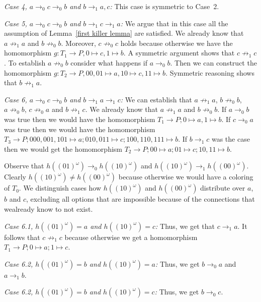 \documentclass[a4paper]{article}
\newcommand{\case}[2]{\vspace{1ex}\noindent\textit{Case #1, #2:}}
\begin{document}
\case{4}{$a \rightarrow_0 c \rightarrow_0 b$ and $b \rightarrow_1 a,c$}
This case is symmetric to Case~2.

\case{5}{$a \rightarrow_0 c \rightarrow_0 b$ and $b \rightarrow_1 c
\rightarrow_1 a$}
We argue that in this case all the assumption of Lemma~\ref{first killer
lemma} are satisfied. We already know that $a \not \rightarrow_1 a$ and
$b \not \rightarrow_0 b$. Moreover, $c \not \rightarrow_0 c$ holds
because otherwise we have the homomorphism $g : T_1 \to P, 0 \mapsto c,
1 \mapsto b$. A symmetric argument shows that $c \not \rightarrow_1 c$.
To establish $a \not \rightarrow_0 b$ consider what happens if $a
\rightarrow_0 b$. Then we can construct the homomorphism $g : T_2 \to P,
00, 01 \mapsto a, 10 \mapsto c, 11 \mapsto b$. Symmetric reasoning shows
that $b \not \rightarrow_1 a$.

\case{6}{$a \rightarrow_0 c \rightarrow_0 b$ and $b \rightarrow_1 a
\rightarrow_1 c$}
We can establish that $a \not \rightarrow_1 a$, $b \not \rightarrow_0
b$, $a \not \rightarrow_0 b$, $c \not \rightarrow_0 a$ and $b \not
\rightarrow_1 c$. We already know that $a \not \rightarrow_1 a$ and $b
\not \rightarrow_0 b$. If $a \rightarrow_0 b$ was true then we would
have the homomorphism $T_1 \to P; 0 \mapsto a, 1 \mapsto b$. If $c
\rightarrow_0 a$ was true then we would have the homomorphism $T_3 \to
P; 000,001,101 \mapsto a; 010,011 \mapsto c; 100,110,111 \mapsto b$. If
$b \rightarrow_1 c$ was the case then we would get the homomorphism $T_2
\to P; 00 \mapsto a; 01 \mapsto c; 10,11 \mapsto b$.

Observe that $h((01)^\omega) \rightarrow_0 h((10)^\omega)$ and 
$h((10)^\omega) \rightarrow_1 h((00)^\omega)$. Clearly
$h((10)^\omega) \neq h((00)^\omega)$ because otherwise we would have a
coloring of $T_0$. We distinguish cases how $h((10)^\omega)$ and
$h((00)^\omega)$ distribute over $a$, $b$ and $c$, excluding all options
that are impossible because of the connections that wealready know to
not exist.

\case{6.1}{$h((01)^\omega) = a$ and $h((10)^\omega) = c$} Thus, we get
that $c \rightarrow_1 a$. It follows that $c \not \rightarrow_1 c$ because
otherwise we get a homomorphism $T_1 \to P; 0 \mapsto a; 1 \mapsto c$.

\case{6.2}{$h((01)^\omega) = b$ and $h((10)^\omega) = a$} Thus, we get
$b \rightarrow_0 a$ and $a \rightarrow_1 b$.

\case{6.2}{$h((01)^\omega) = b$ and $h((10)^\omega) = c$} Thus, we get
$b \rightarrow_0 c$.
\end{document}
